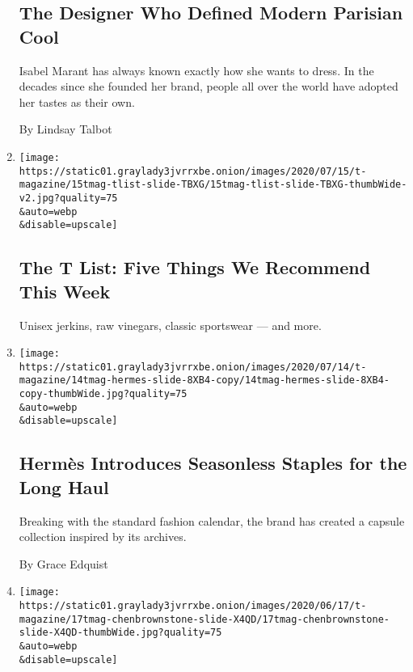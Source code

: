 \begin{enumerate}
  \hypertarget{the-designer-who-defined-modern-parisian-cool}{%
  \subsection{The Designer Who Defined Modern Parisian
  Cool}\label{the-designer-who-defined-modern-parisian-cool}}

  Isabel Marant has always known exactly how she wants to dress. In the
  decades since she founded her brand, people all over the world have
  adopted her tastes as their own.

  By Lindsay Talbot
\item
  \href{/2020/07/16/t-magazine/margo-price-album-tlist.html}{}

  \texttt{[image: https://static01.graylady3jvrrxbe.onion/images/2020/07/15/t-magazine/15tmag-tlist-slide-TBXG/15tmag-tlist-slide-TBXG-thumbWide-v2.jpg?quality=75\\\&auto=webp\\\&disable=upscale]}

  \hypertarget{the-t-list-five-things-we-recommend-this-week-1}{%
  \subsection{The T List: Five Things We Recommend This
  Week}\label{the-t-list-five-things-we-recommend-this-week-1}}

  Unisex jerkins, raw vinegars, classic sportswear --- and more.
\item
  \href{/2020/07/15/t-magazine/hermes-fashion-savoir-faire.html}{}

  \texttt{[image: https://static01.graylady3jvrrxbe.onion/images/2020/07/14/t-magazine/14tmag-hermes-slide-8XB4-copy/14tmag-hermes-slide-8XB4-copy-thumbWide.jpg?quality=75\\\&auto=webp\\\&disable=upscale]}

  \hypertarget{hermuxe8s-introduces-seasonless-staples-for-the-long-haul}{%
  \subsection{Hermès Introduces Seasonless Staples for the Long
  Haul}\label{hermuxe8s-introduces-seasonless-staples-for-the-long-haul}}

  Breaking with the standard fashion calendar, the brand has created a
  capsule collection inspired by its archives.

  By Grace Edquist
\item
  \href{/2020/07/13/t-magazine/brownstone-brooklyn-design.html}{}

  \texttt{[image: https://static01.graylady3jvrrxbe.onion/images/2020/06/17/t-magazine/17tmag-chenbrownstone-slide-X4QD/17tmag-chenbrownstone-slide-X4QD-thumbWide.jpg?quality=75\\\&auto=webp\\\&disable=upscale]}


\end{enumerate}
